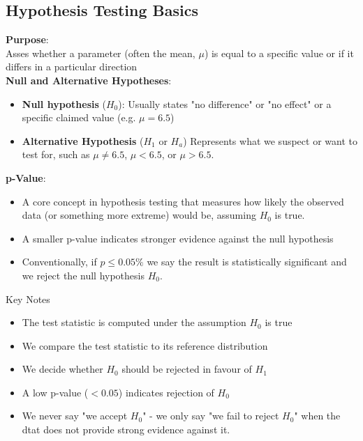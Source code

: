 \documentclass[9pt]{extarticle}
\begin{document}
\subsection{Hypothesis Testing Basics}
\textbf{Purpose}: \\
Asses whether a parameter (often the mean, $\mu$) is equal to a specific value or if it differs in a particular direction  \\[2ex]
\textbf{Null and Alternative Hypotheses}:
\begin{itemize}
    \item \textbf{Null hypothesis} ($H_0$): Usually states "no difference" or "no effect" or a specific claimed value (e.g. $\mu = 6.5$) 
    \item \textbf{Alternative Hypothesis} ($H_1$ or $H_a$) Represents what we suspect or want to test for, such as $\mu \neq 6.5$, $\mu < 6.5$, or $\mu > 6.5$.
\end{itemize}
\textbf{p-Value}: 
\begin{itemize}
    \item A core concept in hypothesis testing that measures how likely the observed data (or something more extreme)  would be, assuming $H_0$ is true. 
    \item A smaller p-value  indicates stronger evidence against the null hypothesis
    \item Conventionally, if $p \leq 0.05\%$ we say the result is statistically significant and we reject the null hypothesis $H_0$. 
\end{itemize}
\begin{conceptbox}{Key Notes}{}
    \begin{itemize}
        \item The test statistic is computed under the assumption $H_0$ is true
        \item We compare the test statistic to its reference distribution
        \item We decide whether $H_0$ should be rejected in favour of $H_1$
        \item A low p-value ($<0.05$) indicates rejection of $H_0$    
        \item We never say "we accept $H_0$" - we only say "we fail to reject $H_0$" when the dtat does not provide strong evidence against it.      
    \end{itemize}
\end{conceptbox}
\end{document}
